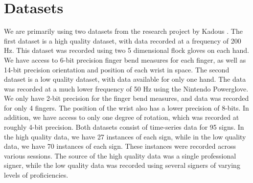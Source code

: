 \documentclass[twocolumn]{article}
\begin{document}
\section{Datasets}
We are primarily using two datasets from the research project by Kadous \cite{kadous2002temporal}. The first dataset is a high quality dataset, with data recorded at a frequency of 200 Hz. This dataset was recorded using two 5 dimensional flock gloves on each hand. We have access to 6-bit precision finger bend measures for each finger, as well as 14-bit precision orientation and position of each wrist in space. The second dataset is a low quality dataset, with data available for only one hand. The data was recorded at a much lower frequency of 50 Hz using the Nintendo Powerglove. We only have 2-bit precision for the finger bend measures, and data was recorded for only 4 fingers. The position of the wrist also has a lower precision of 8-bits. In addition, we have access to only one degree of rotation, which was recorded at roughly 4-bit precision. Both datasets consist of time-series data for 95 signs. In the high quality data, we have 27 instances of each sign, while in the low quality data, we have 70 instances of each sign. These instances were recorded across various sessions. The source of the high quality data was a single professional signer, while the low quality data was recorded using several signers of varying levels of proficiencies. 
\end{document}
